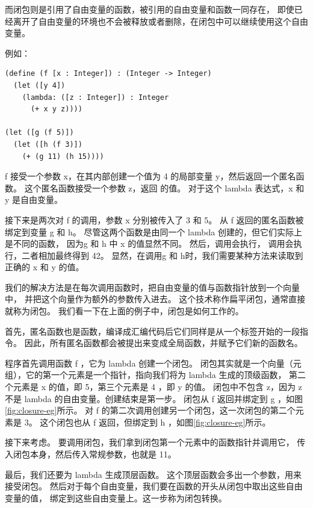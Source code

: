 而闭包则是引用了自由变量的函数，被引用的自由变量和函数一同存在，
即使已经离开了自由变量的环境也不会被释放或者删除，在闭包中可以继续使用这个自由变量。

例如：
\begin{multilinecode}
\begin{lstlisting}
(define (f [x : Integer]) : (Integer -> Integer)
  (let ([y 4])
    (lambda: ([z : Integer]) : Integer
      (+ x y z))))

(let ([g (f 5)])
  (let ([h (f 3)])
    (+ (g 11) (h 15))))
\end{lstlisting}
\end{multilinecode}

f 接受一个参数 x，在其内部创建一个值为 4 的局部变量 y，然后返回一个匿名函数。
这个匿名函数接受一个参数 z，返回  的值。
对于这个 lambda 表达式，x 和 y 是自由变量。

接下来是两次对 f 的调用，参数 x 分别被传入了 3 和 5。
从 f 返回的匿名函数被绑定到变量 g 和 h。
尽管这两个函数是由同一个 lambda 创建的，但它们实际上是不同的函数，
因为g 和 h 中 x 的值显然不同。
然后，调用会执行，
调用会执行，二者相加最终得到 42。
显然，在调用g 和 h时，我们需要某种方法来读取到正确的 x 和 y 的值。

我们的解决方法是在每次调用函数时，把自由变量的值与函数指针放到一个向量中，
并把这个向量作为额外的参数传入进去。
这个技术称作扁平闭包\cite{Cardelli_1983}，通常直接就称为闭包。
我们看一下在上面的例子中，闭包是如何工作的。

首先，匿名函数也是函数，编译成汇编代码后它们同样是从一个标签开始的一段指令。
因此，所有匿名函数都会被提出来变成全局函数，并赋予它们新的函数名。

程序首先调用函数 f ，它为 lambda 创建一个闭包。
闭包其实就是一个向量（元组），它的第一个元素是一个指针，指向我们将为 lambda 生成的顶级函数，
第二个元素是 x 的值，即 5，第三个元素是 4 ，即 y 的值。
闭包中不包含 z，因为 z 不是 lambda 的自由变量。创建结束是第一步。
闭包从 f 返回并绑定到 g ，如图\ref{fig:closure-eg}所示。
对 f 的第二次调用创建另一个闭包，这一次闭包的第二个元素是 3。
这个闭包也从 f 返回，但绑定到 h ，如图\ref{fig:closure-eg}所示。

接下来考虑。
要调用闭包，我们拿到闭包第一个元素中的函数指针并调用它，
传入闭包本身，然后传入常规参数，也就是 11。

最后，我们还要为 lambda 生成顶层函数。
这个顶层函数会多出一个参数，用来接受闭包。
然后对于每个自由变量，我们要在函数的开头从闭包中取出这些自由变量的值，
绑定到这些自由变量上。这一步称为闭包转换。

